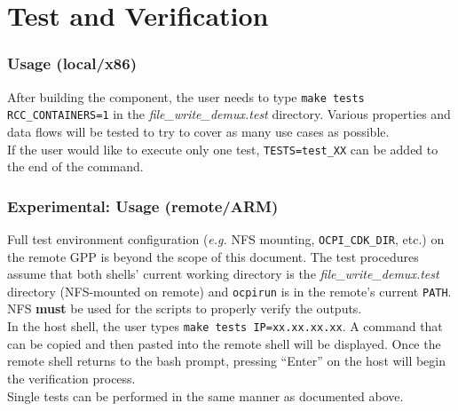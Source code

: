 \documentclass{article}
\begin{document}
\section*{Test and Verification}

\subsubsection*{Usage (local/x86)}
After building the component, the user needs to type \verb+make tests RCC_CONTAINERS=1+ in the \textit{file\_write\_demux.test} directory. Various properties and data flows will be tested to try to cover as many use cases as possible. \\

If the user would like to execute only one test, \verb+TESTS=test_XX+ can be added to the end of the command.

\subsubsection*{\textbf{Experimental}: Usage (remote/ARM)}
Full test environment configuration (\textit{e.g.} NFS mounting, \verb+OCPI_CDK_DIR+, etc.) on the remote GPP is beyond the scope of this document. The test procedures assume that both shells' current working directory is the \textit{file\_write\_demux.test} directory (NFS-mounted on remote) and \verb+ocpirun+ is in the remote's current \verb+PATH+. NFS \textbf{must} be used for the scripts to properly verify the outputs. \\

In the host shell, the user types \verb+make tests IP=xx.xx.xx.xx+. A command that can be copied and then pasted into the remote shell will be displayed. Once the remote shell returns to the bash prompt, pressing ``Enter'' on the host will begin the verification process. \\

Single tests can be performed in the same manner as documented above.
\end{document}
